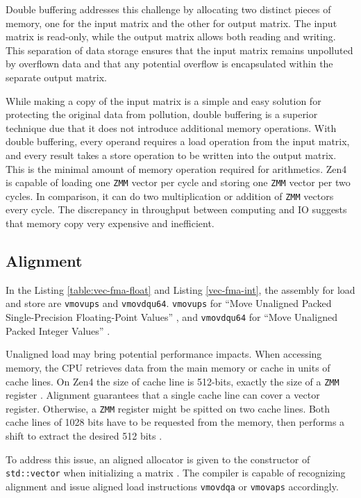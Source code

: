 \documentclass[logo,bsc,singlespacing,parskip]{infthesis}
\newcommand{\zmm}{\texttt{ZMM}}
\begin{document}
Double buffering addresses this challenge by allocating two distinct pieces of
memory, one for the input matrix and the other for output matrix. The input
matrix is read-only, while the output matrix allows both reading and writing.
This separation of data storage ensures that the input matrix remains unpolluted
by overflown data and that any potential overflow is encapsulated within the
separate output matrix. 

While making a copy of the input matrix is a simple and easy solution for
protecting the original data from pollution, double buffering is a superior
technique due that it does not introduce additional memory operations. With
double buffering, every operand requires a load operation from the input matrix,
and every result takes a store operation to be written into the output matrix.
This is the minimal amount of memory operation required for arithmetics. Zen4 is
capable of loading one \zmm{} vector per cycle and storing one \zmm{} vector per two
cycles. In comparison, it can do two multiplication or addition of \zmm{}
vectors every cycle. The discrepancy in throughput between computing and IO
suggests that memory copy very expensive and inefficient. 

\subsection{Alignment}
In the Listing \ref{table:vec-fma-float} and Listing \ref{vec-fma-int}, the
assembly for load and store are \texttt{vmovups} and \texttt{vmovdqu64}. 
\texttt{vmovups} for
``Move Unaligned Packed Single-Precision Floating-Point Values'' \cite{vmovups},
and \texttt{vmovdqu64} for 
``Move Unaligned Packed Integer Values'' \cite{vmovdqu64}. 

Unaligned load may bring potential performance impacts. When accessing memory,
the CPU retrieves data from the main memory or cache in units of cache lines. On
Zen4 the size of cache line is 512-bits, exactly the size of a \zmm{} register
\cite{AMDManual}. Alignment guarantees that a single cache line can cover a
vector register. Otherwise, a \zmm{} register might be spitted on two cache lines.
Both cache lines of 1028 bits have to be requested from the memory, then
performs a shift to extract the desired 512 bits \cite{Unaligned}.  

To address this issue, an aligned allocator is given to the constructor of
\texttt{std::vector} when initializing a matrix \cite{FPL2}. 
 The compiler is capable of recognizing alignment
and issue aligned load instructions \texttt{vmovdqa} or \texttt{vmovaps}
accordingly. 
\end{document}
